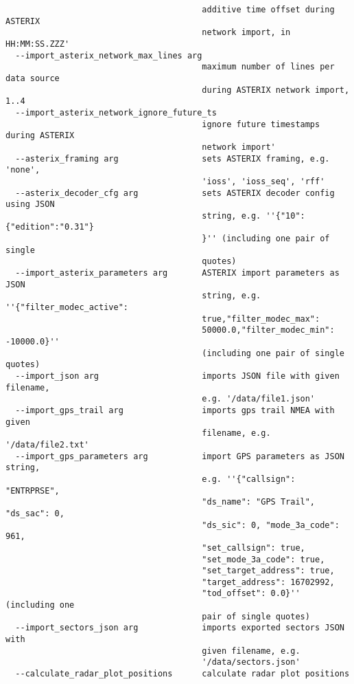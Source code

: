 \begin{lstlisting}
                                        additive time offset during ASTERIX 
                                        network import, in HH:MM:SS.ZZZ'
  --import_asterix_network_max_lines arg
                                        maximum number of lines per data source
                                        during ASTERIX network import, 1..4
  --import_asterix_network_ignore_future_ts 
                                        ignore future timestamps during ASTERIX
                                        network import'
  --asterix_framing arg                 sets ASTERIX framing, e.g. 'none', 
                                        'ioss', 'ioss_seq', 'rff'
  --asterix_decoder_cfg arg             sets ASTERIX decoder config using JSON 
                                        string, e.g. ''{"10":{"edition":"0.31"}
                                        }'' (including one pair of single 
                                        quotes)
  --import_asterix_parameters arg       ASTERIX import parameters as JSON 
                                        string, e.g. ''{"filter_modec_active": 
                                        true,"filter_modec_max": 
                                        50000.0,"filter_modec_min": -10000.0}''
                                        (including one pair of single quotes)
  --import_json arg                     imports JSON file with given filename, 
                                        e.g. '/data/file1.json'
  --import_gps_trail arg                imports gps trail NMEA with given 
                                        filename, e.g. '/data/file2.txt'
  --import_gps_parameters arg           import GPS parameters as JSON string, 
                                        e.g. ''{"callsign": "ENTRPRSE", 
                                        "ds_name": "GPS Trail", "ds_sac": 0, 
                                        "ds_sic": 0, "mode_3a_code": 961, 
                                        "set_callsign": true, 
                                        "set_mode_3a_code": true, 
                                        "set_target_address": true, 
                                        "target_address": 16702992, 
                                        "tod_offset": 0.0}'' (including one 
                                        pair of single quotes)
  --import_sectors_json arg             imports exported sectors JSON with 
                                        given filename, e.g. 
                                        '/data/sectors.json'
  --calculate_radar_plot_positions      calculate radar plot positions

\end{lstlisting}
